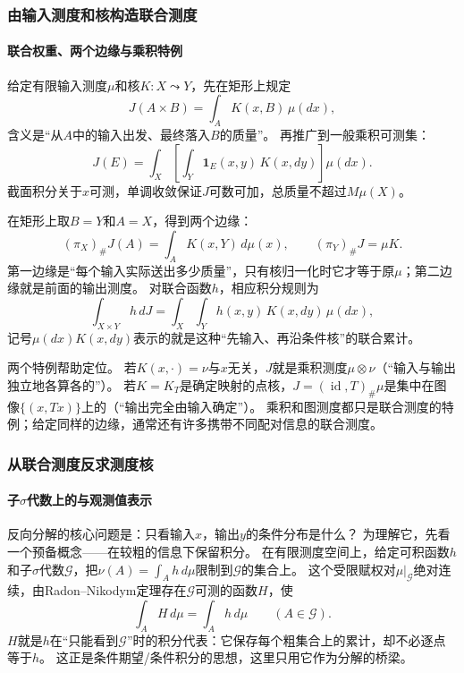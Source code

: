 \subsubsection{由输入测度和核构造联合测度}

\paragraph{联合权重、两个边缘与乘积特例}

给定有限输入测度$\mu$和核$K:X\leadsto Y$，先在矩形上规定
\[
 J(A\times B)=\int_A K(x,B)\,\mu(dx),
\]
含义是“从$A$中的输入出发、最终落入$B$的质量”。
再推广到一般乘积可测集：
\[
 J(E)=\int_X\left[\int_Y\mathbf 1_E(x,y)\,K(x,dy)\right]\mu(dx).
\]
截面积分关于$x$可测，单调收敛保证$J$可数可加，总质量不超过$M\mu(X)$。

在矩形上取$B=Y$和$A=X$，得到两个边缘：
\[
 (\pi_X)_\#J(A)=\int_A K(x,Y)\,d\mu(x),\qquad
 (\pi_Y)_\#J=\mu K.
\]
第一边缘是“每个输入实际送出多少质量”，只有核归一化时它才等于原$\mu$；第二边缘就是前面的输出测度。
对联合函数$h$，相应积分规则为
\begin{equation}
 \int_{X\times Y}h\,dJ
 =\int_X\int_Y h(x,y)\,K(x,dy)\,\mu(dx),
 \label{eq:measure-joint-integral}
\end{equation}
记号$\mu(dx)K(x,dy)$表示的就是这种“先输入、再沿条件核”的联合累计。

两个特例帮助定位。
若$K(x,\cdot)=\nu$与$x$无关，$J$就是乘积测度$\mu\otimes\nu$（“输入与输出独立地各算各的”）。
若$K=K_T$是确定映射的点核，$J=(\operatorname{id},T)_\#\mu$是集中在图像$\{(x,Tx)\}$上的（“输出完全由输入确定”）。
乘积和图测度都只是联合测度的特例；给定同样的边缘，通常还有许多携带不同配对信息的联合测度。

\subsubsection{从联合测度反求测度核}

\paragraph{子$\sigma$代数上的与观测值表示}

反向分解的核心问题是：只看输入$x$，输出$y$的条件分布是什么？
为理解它，先看一个预备概念——在较粗的信息下保留积分。
在有限测度空间上，给定可积函数$h$和子$\sigma$代数$\mathcal G$，把$\nu(A)=\int_Ah\,d\mu$限制到$\mathcal G$的集合上。
这个受限赋权对$\mu|_{\mathcal G}$绝对连续，由Radon–Nikodym定理存在$\mathcal G$可测的函数$H$，使
\[
 \int_A H\,d\mu=\int_A h\,d\mu\qquad(A\in\mathcal G).
\]
$H$就是$h$在“只能看到$\mathcal G$”时的积分代表：它保存每个粗集合上的累计，却不必逐点等于$h$。
这正是条件期望/条件积分的思想，这里只用它作为分解的桥梁。


